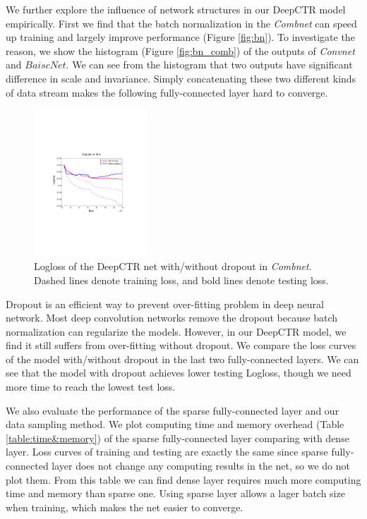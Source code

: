 \documentclass{sig-alternate}
\begin{document}
We further  explore the influence of network structures in our DeepCTR model empirically. First we find that the batch normalization in the \emph{Combnet} can speed up training and largely improve performance (Figure \ref{fig:bn}). To investigate the reason, we show the histogram (Figure \ref{fig:bn_comb}) of the outputs of \emph{Convnet} and $BaiscNet$. We can see from the histogram  that two outputs have significant difference in scale and invariance. Simply concatenating  these two different kinds of data stream  makes the following fully-connected layer hard to converge. 
\begin{figure}
	\centering
	\includegraphics[width=0.38\textwidth]{dropout_test_train}
	\caption{Logloss of the DeepCTR net with/without dropout in \emph{Combnet}. Dashed lines denote training loss, and bold lines denote testing loss.}
	\label{fig:dropout}
\end{figure}

Dropout \cite{srivastava2014dropout} is an efficient way to prevent over-fitting problem in deep neural network. Most deep convolution networks remove the dropout because batch normalization can regularize the models. However, in our DeepCTR model, we find it still suffers from over-fitting without dropout. We compare the loss curves of the model with/without dropout in the last two fully-connected layers. We can see that the model with dropout achieves lower testing Logloss, though we need more time to reach the lowest test loss.


We also evaluate the performance of the sparse fully-connected layer and our data sampling method. We plot computing time and memory overhead (Table \ref{table:time&memory}) of the sparse fully-connected layer comparing with dense layer. Loss curves of training and testing are exactly the same since sparse fully-connected layer does not change any computing results in the net, so we do not plot them. From this table we can find dense layer  requires much more computing time and memory than sparse one. Using sparse layer allows a lager batch size when training, which makes the net easier to converge. 
\end{document}
